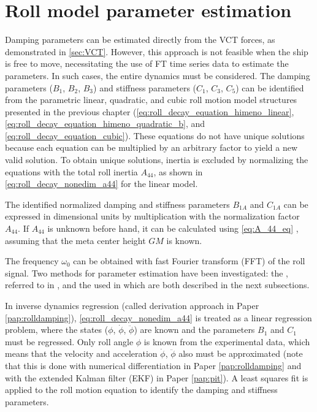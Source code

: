 \section{Roll model parameter estimation} \label{sec:_roll}
\noindent Damping parameters can be estimated directly from the VCT forces, as demonstrated in \autoref{sec:VCT}. However, this approach is not feasible when the ship is free to move, necessitating the use of FT time series data to estimate the parameters. In such cases, the entire dynamics must be considered. The damping parameters ($B_1$, $B_2$, $B_3$) and stiffness parameters ($C_1$, $C_3$, $C_5$) can be identified from the parametric linear, quadratic, and cubic roll motion model structures presented in the previous chapter (\autoref{eq:roll_decay_equation_himeno_linear}, \autoref{eq:roll_decay_equation_himeno_quadratic_b}, and \autoref{eq:roll_decay_equation_cubic}).
These equations do not have unique solutions because each equation can be multiplied by an arbitrary factor to yield a new valid solution. To obtain unique solutions, inertia is excluded by normalizing the equations with the total roll inertia $A_{44}$, as shown in \autoref{eq:roll_decay_nonedim_a44} for the linear model.



\noindent The identified normalized damping and stiffness parameters $B_{1A}$ and $C_{1A}$ can be expressed in dimensional units by multiplication with the normalization factor $A_{44}$. If $A_{44}$ is unknown before hand, it can be calculated using \autoref{eq:A_44_eq} \cite{piehlShipRollDamping2016}, assuming that the meta center height $GM$ is known.

The frequency $\omega_0$ can be obtained with fast Fourier transform (FFT) of the roll signal. 
Two methods for parameter estimation have been investigated: the , referred to in \textcite{imo1200InterimGuidelines2006}, and the  used in \textcite{soderAssessmentShipRoll2019} which are both described in the next subsections. 

In inverse dynamics regression (called derivation approach in Paper \ref{pap:rolldamping}), \autoref{eq:roll_decay_nonedim_a44} is treated as a linear regression problem, where the states ($\phi$, $\dot{\phi}$, $\ddot{\phi}$) are known and the parameters $B_1$ and $C_1$ must be regressed. Only roll angle $\phi$ is known from the experimental data, which means that the velocity and acceleration $\dot{\phi}$, $\ddot{\phi}$ also must be approximated (note that this is done with numerical differentiation in Paper \ref{pap:rolldamping} and with the extended Kalman filter (EKF) in Paper \ref{pap:pit}).
A least squares fit is applied to the roll motion equation to identify the damping and stiffness parameters.

